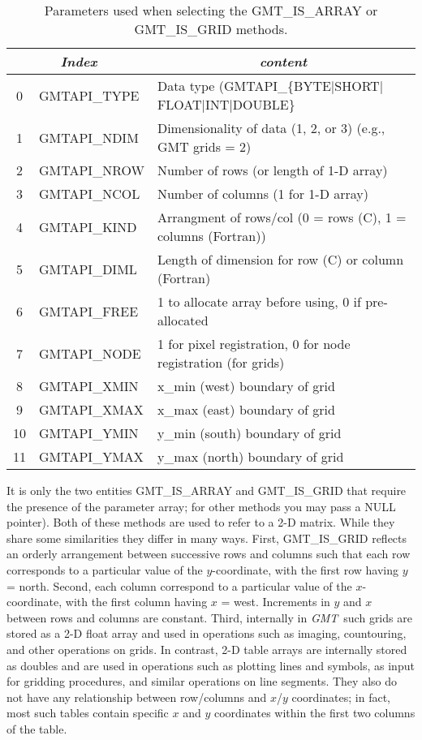 \documentclass{report}
\newcommand{\GMT}{\textit{GMT}}%
\newcommand{\GMT}{\htmladdnormallink{\texttt{[image: eps/GMT\_glyph10.eps]}}{http://gmt.soest.hawaii.edu}}%
\newcommand{\GMT}{\htmladdnormallink{\textbf{GMT}}{http://gmt.soest.hawaii.edu}}%
\begin{document}
\begin{table}[h]
\small
\centering
\begin{tabular}{|c|l|l|} \hline
\multicolumn{2}{|c|}{\emph{Index}} & \multicolumn{1}{c|}{\emph{content}} \\ \hline
0 & GMTAPI\_TYPE	&       Data type (GMTAPI\_\{BYTE$|$SHORT$|$FLOAT$|$INT$|$DOUBLE\} \\ \hline
1 & GMTAPI\_NDIM	&       Dimensionality of data (1, 2, or 3) (e.g., GMT grids = 2)  \\ \hline
2 & GMTAPI\_NROW	&       Number of rows (or length of 1-D array) \\ \hline
3 & GMTAPI\_NCOL	&       Number of columns (1 for 1-D array) \\ \hline
4 & GMTAPI\_KIND	&       Arrangment of rows/col (0 = rows (C), 1 = columns (Fortran))  \\ \hline
5 & GMTAPI\_DIML	&       Length of dimension for row (C) or column (Fortran)  \\ \hline
6 & GMTAPI\_FREE	&       1 to allocate array before using, 0 if pre-allocated  \\ \hline \hline
7 & GMTAPI\_NODE	&       1 for pixel registration, 0 for node registration (for grids)  \\ \hline
8 & GMTAPI\_XMIN	&       x\_min (west) boundary of grid  \\ \hline
9 & GMTAPI\_XMAX	&       x\_max (east) boundary of grid  \\ \hline
10 & GMTAPI\_YMIN	&       y\_min (south) boundary of grid  \\ \hline
11 & GMTAPI\_YMAX	&       y\_max (north) boundary of grid  \\ \hline
\end{tabular}
\caption{Parameters used when selecting the GMT\_IS\_ARRAY or GMT\_IS\_GRID methods.}
\label{tbl:pars}
\end{table}

It is only the two entities GMT\_IS\_ARRAY and GMT\_IS\_GRID that require the presence of
the parameter array; for other methods you may pass a NULL pointer).  Both of these
methods are used to refer to a 2-D matrix.  While they share some similarities
they differ in many ways.  First, GMT\_IS\_GRID reflects an orderly arrangement between
successive rows and columns such that each row corresponds to a particular value of the $y$-coordinate,
with the first row having $y$ = north.  Second, each column correspond to a particular value
of the $x$-coordinate, with the first column having $x$ = west. Increments in $y$ and $x$ 
between rows and columns are constant. Third, internally in \GMT\ such grids are stored as
a 2-D float array and used in operations such as imaging, countouring, and other operations
on grids.  In contrast, 2-D table arrays are internally stored as doubles and are used in
operations such as plotting lines and symbols, as input for gridding procedures, and similar
operations on line segments.  They also do not have any relationship between row/columns and $x$/$y$ coordinates;
in fact, most such tables contain specific $x$ and $y$ coordinates within the first two
columns of the table.
\end{document}
